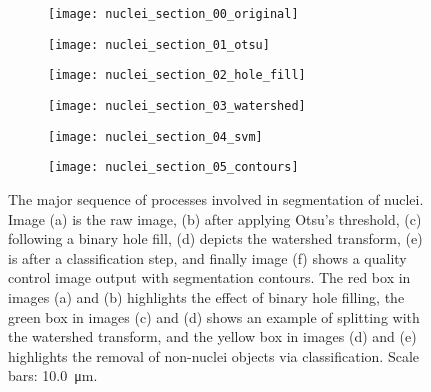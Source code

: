 \begin{figure}[htbp]\centering
	\begin{subfigure}[b]{0.25\linewidth} %
		\centering
		\texttt{[image: nuclei\_section\_00\_original]}
		\caption{}
		\label{figure:image_processing:nuclei_segmentation:00}
		\vspace{1ex}
	\end{subfigure}
	\begin{subfigure}[b]{0.25\linewidth} %
		\centering
		\texttt{[image: nuclei\_section\_01\_otsu]}
		\caption{}
		\label{figure:image_processing:nuclei_segmentation:01}
		\vspace{1ex}
	\end{subfigure}
	\begin{subfigure}[b]{0.25\linewidth} %
		\centering
		\texttt{[image: nuclei\_section\_02\_hole\_fill]}
		\caption{}
		\label{figure:image_processing:nuclei_segmentation:02}
		\vspace{1ex}
	\end{subfigure}
	\begin{subfigure}[b]{0.25\linewidth} %
		\centering
		\texttt{[image: nuclei\_section\_03\_watershed]}
		\caption{}
		\label{figure:image_processing:nuclei_segmentation:03}
		\vspace{1ex}
	\end{subfigure}
	\begin{subfigure}[b]{0.25\linewidth} %
		\centering
		\texttt{[image: nuclei\_section\_04\_svm]}
		\caption{}
		\label{figure:image_processing:nuclei_segmentation:04}
		\vspace{1ex}
	\end{subfigure}
	\begin{subfigure}[b]{0.25\linewidth} %
		\centering
		\texttt{[image: nuclei\_section\_05\_contours]}
		\caption{}
		\label{figure:image_processing:nuclei_segmentation:05}
		\vspace{1ex}
	\end{subfigure}
\caption[Nuclei segmentation]{The major sequence of processes involved in segmentation of nuclei. Image (a) is the raw image, (b) after applying Otsu's threshold, (c) following a binary hole fill, (d) depicts the watershed transform, (e) is after a classification step, and finally image (f) shows a quality control image output with segmentation contours. The red box in images (a) and (b) highlights the effect of binary hole filling, the green box in images (c) and (d) shows an example of splitting with the watershed transform, and the yellow box in images (d) and (e) highlights the removal of non-nuclei objects via classification. Scale bars: \SI{10.0}{\micro\meter}.}
\label{figure:image_processing:nuclei_segmentation}
\end{figure}

